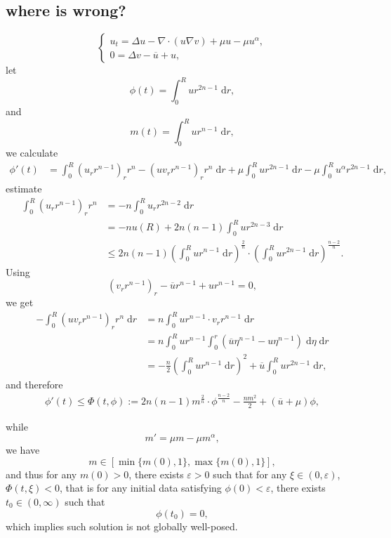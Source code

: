 \documentclass[en,hazy,screen,blue,14pt]{elegantnote}
\numberwithin{dummy}{section}
\newcommand{\dd}{\;\mathrm{d}}
\begin{document}
\subsection{where is wrong?}
\begin{equation}
	\begin{cases}
		u_t = \Delta u - \nabla\cdot(u\nabla v) + \mu u - \mu u^\alpha,\\
		0 = \Delta v - \overline u + u,
	\end{cases}
\end{equation}
let 
\[
	\phi(t) = \int_0^R ur^{2n-1}\dd r,
\]
and
\[
	m(t) = \int_0^R ur^{n-1}\dd r,
\]
we calculate
\begin{align*}
	\phi'(t) &=
	\int_0^R(u_rr^{n-1})_rr^n - (uv_rr^{n-1})_rr^n\dd r 
		+ \mu\int_0^R u r^{2n-1}\dd r - \mu \int_0^Ru^\alpha r^{2n-1}\dd r,
\end{align*}
estimate
\begin{align*}
	\int_0^R(u_rr^{n-1})_rr^n 
		&= - n\int_0^Ru_rr^{2n-2}\dd r\\
		&= -nu(R) + 2n(n-1)\int_0^Rur^{2n-3}\dd r\\
		&\leq 2n(n-1)\left(\int_0^Rur^{n-1}\dd r\right)^{\frac{2}{n}}
			\cdot \left(\int_0^Rur^{2n-1}\dd r\right)^{\frac{n-2}{n}}.
\end{align*}
Using 
\[
	(v_rr^{n-1})_r -\overline{u}r^{n-1} + ur^{n-1} = 0,
\]
we get
\begin{align*}
	- \int_0^R (uv_rr^{n-1})_rr^n\dd r 
		&= n\int_0^Rur^{n-1}\cdot v_rr^{n-1}\dd r \\
		&= n\int_0^R ur^{n-1} \int_0^r(\overline{u}\eta^{n-1} - u\eta^{n-1})\dd\eta\dd r\\
		&= - \frac{n}2\left(\int_0^Rur^{n-1}\dd r\right)^2 + \overline{u}\int_0^R ur^{2n-1}\dd r, 
\end{align*}
and therefore
\begin{align*}
	\phi'(t) \leq \Phi(t, \phi) := 2n(n-1)m^{\frac2n}\cdot \phi^{\frac{n-2}{n}} - \frac{nm^2}2 + (\overline{u} + \mu)\phi,
\end{align*}

while
\[
	m' = \mu m - \mu m^\alpha,
\]
we have 
\[
	m\in\left[\min\{m(0),1\}, \max\{m(0),1\}\right],
\]
and thus for any $m(0)>0$, there exists $\varepsilon>0$ 
such that for any $\xi\in(0,\varepsilon)$,
$\Phi(t,\xi) < 0$,
that is for any initial data satisfying $\phi(0) < \varepsilon$, 
there exists $t_0\in(0,\infty)$ such that 
\[
	\phi(t_0) = 0,
\]
which implies such solution is not globally well-posed.
\end{document}
